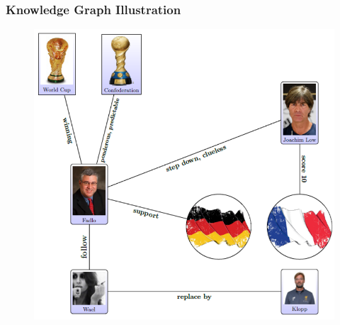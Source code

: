 \documentclass[xcolor=table]{beamer}
\begin{document}

\begin{frame}
\frametitle{Knowledge Graph Illustration}
\begin{figure}[!htb]
   \centering
    \includegraphics[scale=0.4]{img0008.png}
    
\end{figure}

\end{frame}
\end{document}
